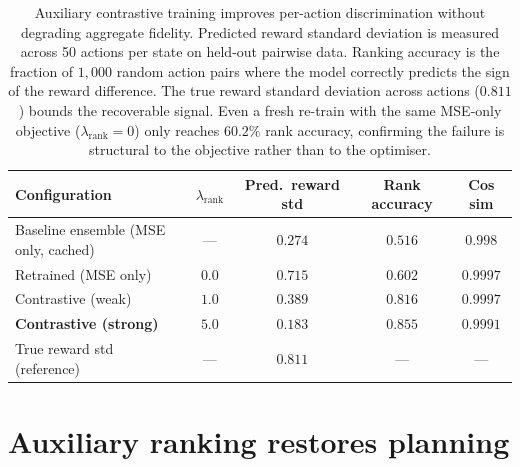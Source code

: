 \documentclass[11pt]{article}
\begin{document}

\begin{table}[htbp]
\centering
\small
\caption{Auxiliary contrastive training improves per-action discrimination without degrading aggregate fidelity. Predicted reward standard deviation is measured across 50 actions per state on held-out pairwise data. Ranking accuracy is the fraction of $1{,}000$ random action pairs where the model correctly predicts the sign of the reward difference. The true reward standard deviation across actions ($0.811$) bounds the recoverable signal. Even a fresh re-train with the same MSE-only objective ($\lambda_{\text{rank}}{=}0$) only reaches $60.2\%$ rank accuracy, confirming the failure is structural to the objective rather than to the optimiser.}
\label{tab:contrastive-disc}
\begin{tabular}{lcccc}
\toprule
Configuration & $\lambda_{\text{rank}}$ & Pred.\ reward std & Rank accuracy & Cos sim \\
\midrule
Baseline ensemble (MSE only, cached) & --- & $0.274$ & $0.516$ & $0.998$ \\
Retrained (MSE only)                  & $0.0$ & $0.715$ & $0.602$ & $0.9997$ \\
Contrastive (weak)                    & $1.0$ & $0.389$ & $0.816$ & $0.9997$ \\
\textbf{Contrastive (strong)}         & $\mathbf{5.0}$ & $0.183$ & $\mathbf{0.855}$ & $\mathbf{0.9991}$ \\
\midrule
True reward std (reference)           & --- & $0.811$ & --- & --- \\
\bottomrule
\end{tabular}
\end{table}

\section{Auxiliary ranking restores planning}\label{sec:fix}
\end{document}
